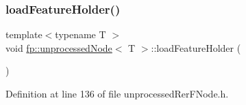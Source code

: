 \subsubsection{\texorpdfstring{load\+Feature\+Holder()}{loadFeatureHolder()}\hspace{0.1cm}{\footnotesize\ttfamily [2/2]}}
{\footnotesize\ttfamily template$<$typename T $>$ \\
void \hyperlink{classfp_1_1unprocessedNode}{fp\+::unprocessed\+Node}$<$ T $>$\+::load\+Feature\+Holder (\begin{DoxyParamCaption}{ }\end{DoxyParamCaption})\hspace{0.3cm}{\ttfamily [inline]}}



Definition at line 136 of file unprocessed\+Rer\+F\+Node.\+h.



